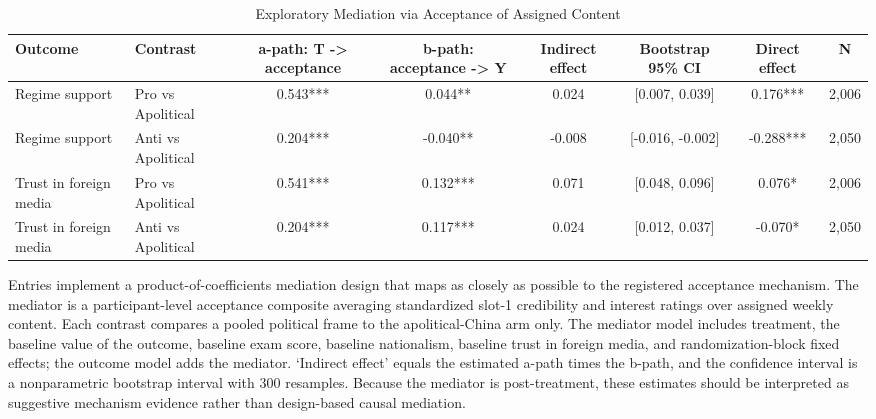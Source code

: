 \begin{table}[H]
\centering
\caption{Exploratory Mediation via Acceptance of Assigned Content}
\label{tab:acceptance_mediation}
\footnotesize
\begin{threeparttable}
\begin{tabular}{llcccccc}
\toprule
Outcome & Contrast & a-path: T -> acceptance & b-path: acceptance -> Y & Indirect effect & Bootstrap 95\% CI & Direct effect & N \\
\midrule
Regime support & Pro vs Apolitical & 0.543*** & 0.044** & 0.024 & [0.007, 0.039] & 0.176*** & 2,006 \\
Regime support & Anti vs Apolitical & 0.204*** & -0.040** & -0.008 & [-0.016, -0.002] & -0.288*** & 2,050 \\
Trust in foreign media & Pro vs Apolitical & 0.541*** & 0.132*** & 0.071 & [0.048, 0.096] & 0.076* & 2,006 \\
Trust in foreign media & Anti vs Apolitical & 0.204*** & 0.117*** & 0.024 & [0.012, 0.037] & -0.070* & 2,050 \\
\bottomrule
\end{tabular}
\begin{tablenotes}[flushleft]
\footnotesize
\item Entries implement a product-of-coefficients mediation design that maps as closely as possible to the registered acceptance mechanism. The mediator is a participant-level acceptance composite averaging standardized slot-1 credibility and interest ratings over assigned weekly content. Each contrast compares a pooled political frame to the apolitical-China arm only. The mediator model includes treatment, the baseline value of the outcome, baseline exam score, baseline nationalism, baseline trust in foreign media, and randomization-block fixed effects; the outcome model adds the mediator. `Indirect effect' equals the estimated a-path times the b-path, and the confidence interval is a nonparametric bootstrap interval with 300 resamples. Because the mediator is post-treatment, these estimates should be interpreted as suggestive mechanism evidence rather than design-based causal mediation.
\end{tablenotes}
\end{threeparttable}
\end{table}
